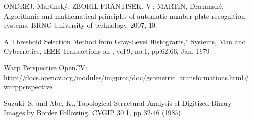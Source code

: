 
\begin{thebibliography}{99}

 ONDREJ, Martinský; ZBORIL FRANTISEK, V.; MARTIN, Drahanský. 
Algorithmic and mathematical principles of automatic number plate recognition systems. 
BRNO University of technology, 2007, 10.

 A Threshold Selection Method from Gray-Level Histograms," Systems, Man and Cybernetics, IEEE Transactions on , vol.9, no.1, pp.62,66, Jan. 1979

 Warp Perspective OpenCV:\\
  \url{http://docs.opencv.org/modules/imgproc/doc/geometric_transformations.html#warpperspective}

 Suzuki, S. and Abe, K., Topological Structural Analysis of Digitized Binary Images by Border Following. CVGIP 30 1, pp 32-46 (1985)


\end{thebibliography}

\vfill
